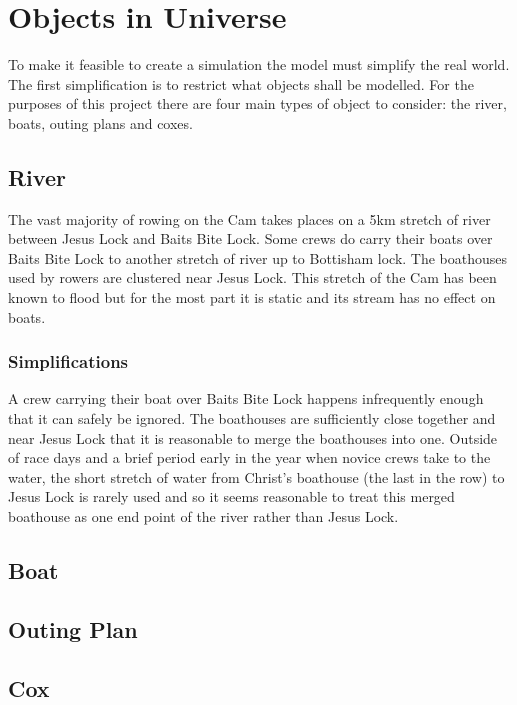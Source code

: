 \section{Objects in Universe}

To make it feasible to create a simulation the model must simplify the real world. The first simplification is to restrict what objects shall be modelled. For the purposes of this project there are four main types of object to consider: the river, boats, outing plans and coxes. 

\subsection{River}
The vast majority of rowing on the Cam takes places on a 5km stretch of river between Jesus Lock and Baits Bite Lock. Some crews do carry their boats over Baits Bite Lock to another stretch of river up to Bottisham lock. The boathouses used by rowers are clustered near Jesus Lock.  This stretch of the Cam has been known to flood but for the most part it is static and its stream has no effect on boats. 

\subsubsection{Simplifications}
A crew carrying their boat over Baits Bite Lock happens infrequently enough that it can safely be ignored.
The boathouses are sufficiently close together and near Jesus Lock that it is reasonable to merge the boathouses into one. 
Outside of race days and a brief period early in the year when novice crews take to the water, the short stretch of water from Christ's boathouse (the last in the row) to Jesus Lock is rarely used and so it seems reasonable to treat this merged boathouse as one end point of the river rather than Jesus Lock.


\subsection{Boat}

\subsection{Outing Plan}

\subsection{Cox}
